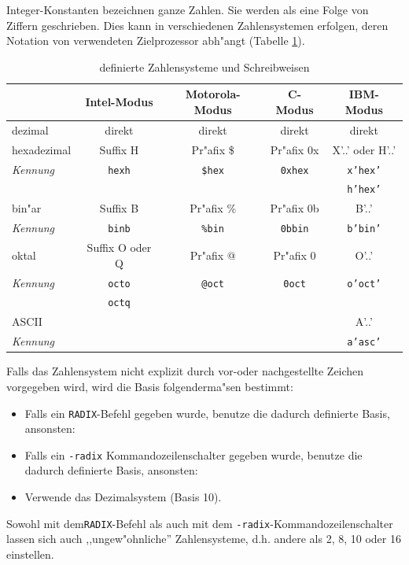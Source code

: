 \documentclass[12pt,a4paper,twoside]{report}
\newcommand{\ii}[1]{{\it #1}}
\newcommand{\tty}[1]{{\tt #1}}
\begin{document}
Integer-Konstanten bezeichnen ganze Zahlen.  Sie werden als eine
Folge von Ziffern geschrieben.  Dies kann in verschiedenen
Zahlensystemen erfolgen, deren Notation von verwendeten
Zielprozessor abh"angt (Tabelle
\ref{TabSystems}).
\par
\begin{table}[htbp]
\begin{center}\begin{tabular}{|l|c|c|c|c|}
\hline
            & Intel-Modus     & Motorola-Modus & C-Modus  & IBM-Modus  \\
\hline
\hline
dezimal     & direkt          & direkt      & direkt      & direkt \\
hexadezimal & Suffix H        & Pr"afix \$  & Pr"afix 0x  & X'..' oder H'..' \\
\ii{Kennung}& \tty{hexh}      & \tty{\$hex} & \tty{0xhex} & \tty{x'hex'} \\
            &                 &             &             & \tty{h'hex'} \\
bin"ar      & Suffix B        & Pr"afix \%  & Pr"afix 0b  & B'..' \\
\ii{Kennung}& \tty{binb}      & \tty{\%bin} & \tty{0bbin} & \tty{b'bin'} \\
oktal       & Suffix O oder Q & Pr"afix @   & Pr"afix 0   & O'..' \\
\ii{Kennung}& \tty{octo}      & \tty{@oct}  & \tty{0oct}  & \tty{o'oct'} \\  
            & \tty{octq}      &             &             & \\
ASCII       &                 &             &             & A'..' \\
\ii{Kennung}&                 &             &             & \tty{a'asc'} \\
\hline
\end{tabular}\end{center}
\caption{definierte Zahlensysteme und Schreibweisen\label{TabSystems}}
\end{table}
Falls das Zahlensystem nicht explizit durch vor-oder nachgestellte Zeichen
vorgegeben wird, wird die Basis folgenderma"sen bestimmt:
\begin{itemize}
\item{Falls ein {\tt RADIX}-Befehl gegeben wurde, benutze die dadurch
      definierte Basis, ansonsten:}
\item{Falls ein {\tt -radix} Kommandozeilenschalter gegeben wurde,
      benutze die dadurch definierte Basis, ansonsten:}
\item{Verwende das Dezimalsystem (Basis 10).}
\end{itemize}
Sowohl mit dem{\tt RADIX}-Befehl als auch mit dem {\tt -radix}-Kommandozeilenschalter
lassen sich auch ,,ungew"ohnliche'' Zahlensysteme, d.h. andere als 2, 8,
10 oder 16 einstellen.
\end{document}
